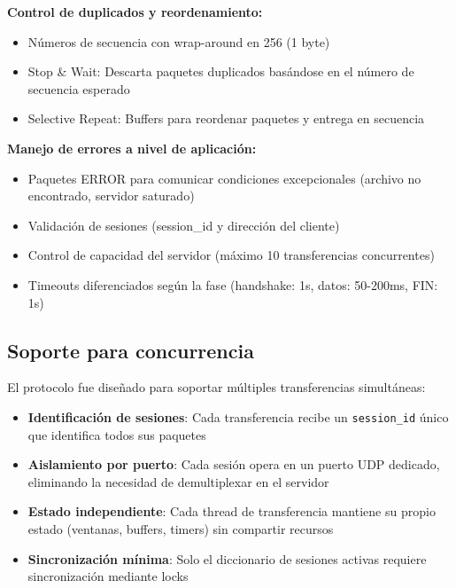 \begin{enumerate}
    \textbf{Control de duplicados y reordenamiento:}
    \begin{itemize}
        \item Números de secuencia con wrap-around en 256 (1 byte)
        \item Stop \& Wait: Descarta paquetes duplicados basándose en el número de secuencia esperado
        \item Selective Repeat: Buffers para reordenar paquetes y entrega en secuencia
    \end{itemize}
    
    \textbf{Manejo de errores a nivel de aplicación:}
    \begin{itemize}
        \item Paquetes ERROR para comunicar condiciones excepcionales (archivo no encontrado, servidor saturado)
        \item Validación de sesiones (session\_id y dirección del cliente)
        \item Control de capacidad del servidor (máximo 10 transferencias concurrentes)
        \item Timeouts diferenciados según la fase (handshake: 1s, datos: 50-200ms, FIN: 1s)
    \end{itemize}
    
    \subsection*{Soporte para concurrencia}
    
    El protocolo fue diseñado para soportar múltiples transferencias simultáneas:
    
    \begin{itemize}
        \item \textbf{Identificación de sesiones}: Cada transferencia recibe un \texttt{session\_id} único que identifica todos sus paquetes
        \item \textbf{Aislamiento por puerto}: Cada sesión opera en un puerto UDP dedicado, eliminando la necesidad de demultiplexar en el servidor
        \item \textbf{Estado independiente}: Cada thread de transferencia mantiene su propio estado (ventanas, buffers, timers) sin compartir recursos
        \item \textbf{Sincronización mínima}: Solo el diccionario de sesiones activas requiere sincronización mediante locks
    \end{itemize}
    

\end{enumerate}
